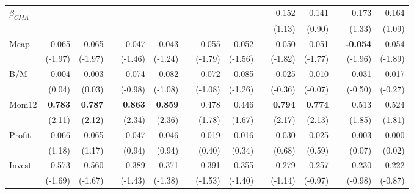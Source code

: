 \begin{singlespacing}
\begin{table}[h!]
\begin{tabular}{lrrrrrrrrrrrrrr}
$\beta_{CMA}$  &                &                &           &                &                &           &                &                &  & 0.152          & 0.141          &  & 0.173           & 0.164          \\
      &                &                &           &                &                &           &                &                &  & (1.13)         & (0.90)         &  & (1.33)          & (1.09)         \\
Mcap  & -0.065         & -0.065         &           & -0.047         & -0.043         &           & -0.055         & -0.052         &  & -0.050         & -0.051         &  & \textbf{-0.054} & -0.054         \\
      & (-1.97)        & (-1.97)        &           & (-1.46)        & (-1.24)        &           & (-1.79)        & (-1.56)        &  & (-1.82)        & (-1.77)        &  & (-1.96)         & (-1.89)        \\
B/M   & 0.004          & 0.003          &           & -0.074         & -0.082         &           & 0.072          & -0.085         &  & -0.025         & -0.010         &  & -0.031          & -0.017         \\
      & (0.04)         & (0.03)         &           & (-0.98)        & (-1.08)        &           & (-1.08)        & (-1.26)        &  & (-0.36)        & (-0.07)        &  & (-0.50)         & (-0.27)        \\
Mom12 & \textbf{0.783} & \textbf{0.787} & \textbf{} & \textbf{0.863} & \textbf{0.859} &           & 0.478          & 0.446          &  & \textbf{0.794} & \textbf{0.774} &  & 0.513           & 0.524          \\
      & (2.11)         & (2.12)         &           & (2.34)         & (2.36)         &           & (1.78)         & (1.67)         &  & (2.17)         & (2.13)         &  & (1.85)          & (1.81)         \\
Profit    & 0.066          & 0.065          &           & 0.047          & 0.046          &           & 0.019          & 0.016          &  & 0.030          & 0.025          &  & 0.003           & 0.000          \\
      & (1.18)         & (1.17)         &           & (0.94)         & (0.94)         &           & (0.40)         & (0.34)         &  & (0.68)         & (0.59)         &  & (0.07)          & (0.02)         \\
Invest  & -0.573         & -0.560         &           & -0.389         & -0.371         &           & -0.391         & -0.355         &  & -0.279         & 0.257          &  & -0.230          & -0.222         \\
      & (-1.69)        & (-1.67)        &           & (-1.43)        & (-1.38)        &           & (-1.53)        & (-1.40)        &  & (-1.14)        & (-0.97)        &  & (-0.98)         & (-0.87)         \\ \hline
\end{tabular}
\end{table}
\end{singlespacing}
